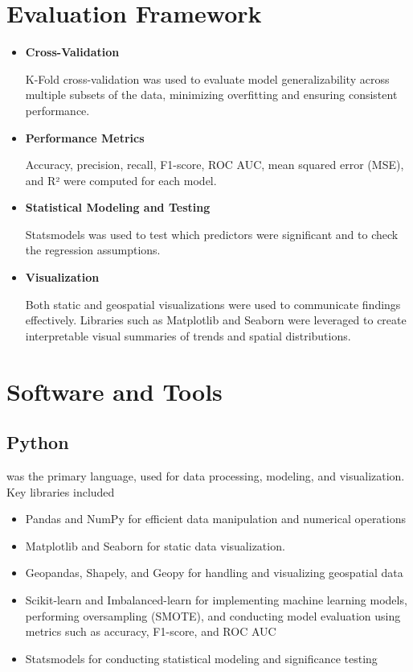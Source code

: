 \documentclass{report}
\begin{document}
\section{Evaluation Framework}

\begin{itemize}
\item \textbf{Cross-Validation}
  \par K-Fold cross-validation was used to evaluate model generalizability across multiple subsets of the data, minimizing overfitting and ensuring consistent performance.
  
\item \textbf{Performance Metrics}
  \par Accuracy, precision, recall, F1-score, ROC AUC, mean squared error (MSE), and R² were computed for each model.
  
\item \textbf{Statistical Modeling and Testing}
  \par Statsmodels was used to test which predictors were significant and to check the regression assumptions.
  
\item \textbf{Visualization}
  \par Both static and geospatial visualizations were used to communicate findings effectively. Libraries such as Matplotlib and Seaborn were leveraged to create interpretable visual summaries of trends and spatial distributions.
\end{itemize}

\section{Software and Tools}
\subsection{Python}
\par was the primary language, used for data processing, modeling, and visualization. Key libraries included
\begin{itemize}
\item Pandas and NumPy for efficient data manipulation and numerical operations
\item Matplotlib and Seaborn for static data visualization.
\item Geopandas, Shapely, and Geopy for handling and visualizing geospatial data
\item Scikit-learn and Imbalanced-learn for implementing machine learning models, performing oversampling (SMOTE), and conducting model evaluation using metrics such as accuracy, F1-score, and ROC AUC
\item Statsmodels for conducting statistical modeling and significance testing
\end{itemize}
\end{document}
